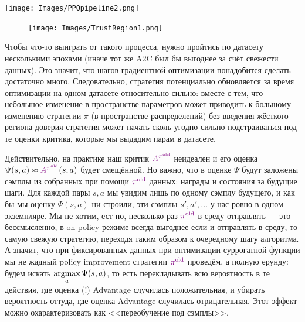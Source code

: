 \vspace{0.4cm}
\begin{center}
\texttt{[image: Images/PPOpipeline2.png]}
\end{center}

\begin{figure}
\vspace{-0.5cm}
\centering
\texttt{[image: Images/TrustRegion1.png]}
\vspace{-0.5cm}
\end{figure}

Чтобы что-то выиграть от такого процесса, нужно пройтись по датасету несколькими эпохами (иначе тот же A2C был бы выгоднее за счёт свежести данных). Это значит, что шагов градиентной оптимизации понадобится сделать достаточно много. Следовательно, стратегия потенциально обновляется за время оптимизации на одном датасете относительно сильно: вместе с тем, что небольшое изменение в пространстве параметров может приводить к большому изменению стратегии $\pi$ (в пространстве распределений) без введения жёсткого региона доверия стратегия может начать сколь угодно сильно подстраиваться под те оценки критика, которые мы выдадим парам в датасете.

Действительно, на практике наш критик $\textcolor{ChadPurple}{A^{\pi^{\old}}}$ неидеален и его оценка $\Psi(s, a) \HM\approx \textcolor{ChadPurple}{A^{\pi^{\old}}}(s, a)$ будет смещённой. Но важно, что в оценке $\Psi$ будут заложены сэмплы из собранных при помощи $\textcolor{ChadPurple}{\pi^{\old}}$ данных: награды и состояния за будущие шаги. Для каждой пары $s, a$ мы увидим лишь по одному сэмплу будущего, и как бы мы оценку $\Psi(s, a)$ ни строили, эти сэмплы $s', a', \dots$ у нас ровно в одном экземпляре. Мы не хотим, ест-но, несколько раз $\textcolor{ChadPurple}{\pi^{\old}}$ в среду отправлять --- это бессмысленно, в on-policy режиме всегда выгоднее если и отправлять в среду, то самую свежую стратегию, переходя таким образом к очередному шагу алгоритма. А значит, что при фиксированных данных при оптимизации суррогатной функции мы не жадный policy improvement стратегии $\textcolor{ChadPurple}{\pi^{\old}}$ проведём, а полную ерунду: будем искать $\mathop{\mathrm{argmax}}\limits_{a} \Psi(s, a)$, то есть перекладывать всю вероятность в те действия, где оценка (!) Advantage случилась положительная, и убирать вероятность оттуда, где оценка Advantage случилась отрицательная. Этот эффект можно охарактеризовать как <<переобучение под сэмплы>>.

